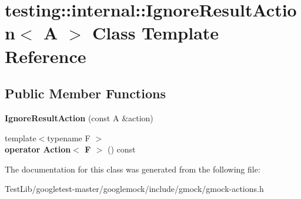 \hypertarget{classtesting_1_1internal_1_1IgnoreResultAction}{}\section{testing\+:\+:internal\+:\+:Ignore\+Result\+Action$<$ A $>$ Class Template Reference}
\label{classtesting_1_1internal_1_1IgnoreResultAction}
\subsection*{Public Member Functions}
\begin{DoxyCompactItemize}
\item 
\mbox{\label{classtesting_1_1internal_1_1IgnoreResultAction_a9199f7b1b7771b2e2a5fd28caf624623}} 
{\bfseries Ignore\+Result\+Action} (const A \&action)
\item 
\mbox{\label{classtesting_1_1internal_1_1IgnoreResultAction_affb8b7439604c860e1416f45339c6e37}} 
{\footnotesize template$<$typename F $>$ }\\{\bfseries operator Action$<$ F $>$} () const
\end{DoxyCompactItemize}


The documentation for this class was generated from the following file\+:\begin{DoxyCompactItemize}
\item 
Test\+Lib/googletest-\/master/googlemock/include/gmock/gmock-\/actions.\+h\end{DoxyCompactItemize}

